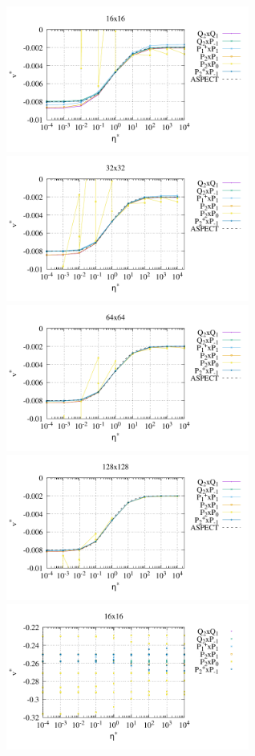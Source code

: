 \begin{center}
\includegraphics[width=8cm]{python_codes/fieldstone_120/paperresults/sinker/structured/sinker_vel_16}
\includegraphics[width=8cm]{python_codes/fieldstone_120/paperresults/sinker/structured/sinker_vel_32}\\
\includegraphics[width=8cm]{python_codes/fieldstone_120/paperresults/sinker/structured/sinker_vel_64}
\includegraphics[width=8cm]{python_codes/fieldstone_120/paperresults/sinker/structured/sinker_vel_128}\\
\includegraphics[width=8cm]{python_codes/fieldstone_120/paperresults/sinker/structured/sinker_press_16}

\end{center}
